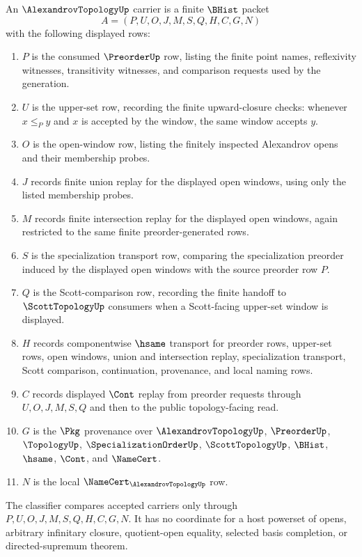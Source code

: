 \begin{definition}\label{def:alexandrov-topology-carrier}
An $\AlexandrovTopologyUp$ carrier is a finite $\BHist$ packet
$$
A=(P,U,O,J,M,S,Q,H,C,G,N)
$$
with the following displayed rows:
\begin{enumerate}
\item $P$ is the consumed $\PreorderUp$ row, listing the finite point names, reflexivity witnesses, transitivity witnesses, and comparison requests used by the generation.
\item $U$ is the upper-set row, recording the finite upward-closure checks: whenever $x \leq_P y$ and $x$ is accepted by the window, the same window accepts $y$.
\item $O$ is the open-window row, listing the finitely inspected Alexandrov opens and their membership probes.
\item $J$ records finite union replay for the displayed open windows, using only the listed membership probes.
\item $M$ records finite intersection replay for the displayed open windows, again restricted to the same finite preorder-generated rows.
\item $S$ is the specialization transport row, comparing the specialization preorder induced by the displayed open windows with the source preorder row $P$.
\item $Q$ is the Scott-comparison row, recording the finite handoff to $\ScottTopologyUp$ consumers when a Scott-facing upper-set window is displayed.
\item $H$ records componentwise $\hsame$ transport for preorder rows, upper-set rows, open windows, union and intersection replay, specialization transport, Scott comparison, continuation, provenance, and local naming rows.
\item $C$ records displayed $\Cont$ replay from preorder requests through $U,O,J,M,S,Q$ and then to the public topology-facing read.
\item $G$ is the $\Pkg$ provenance over $\AlexandrovTopologyUp$, $\PreorderUp$, $\TopologyUp$, $\SpecializationOrderUp$, $\ScottTopologyUp$, $\BHist$, $\hsame$, $\Cont$, and $\NameCert$.
\item $N$ is the local $\NameCert_{\AlexandrovTopologyUp}$ row.
\end{enumerate}
The classifier compares accepted carriers only through $P,U,O,J,M,S,Q,H,C,G,N$. It has no coordinate for a host powerset of opens, arbitrary infinitary closure, quotient-open equality, selected basis completion, or directed-supremum theorem.
\end{definition}

